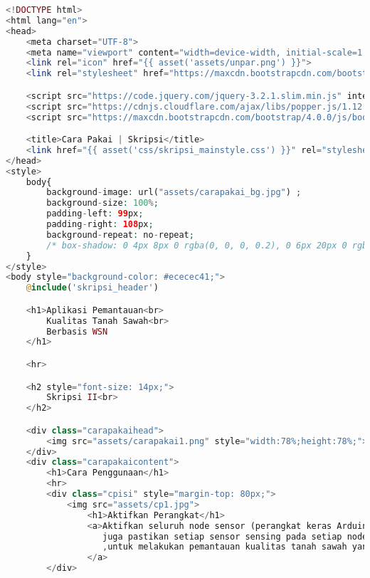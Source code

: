 \begin{lstlisting}[language=PHP, caption=skripsi\_carapakai.blade.php]
<!DOCTYPE html>
<html lang="en">
<head>
    <meta charset="UTF-8">
    <meta name="viewport" content="width=device-width, initial-scale=1.0, shrink-to-fit=no">
    <link rel="icon" href="{{ asset('assets/unpar.png') }}">
    <link rel="stylesheet" href="https://maxcdn.bootstrapcdn.com/bootstrap/4.0.0/css/bootstrap.min.css" integrity="sha384-Gn5384xqQ1aoWXA+058RXPxPg6fy4IWvTNh0E263XmFcJlSAwiGgFAW/dAiS6JXm" crossorigin="anonymous">

    <script src="https://code.jquery.com/jquery-3.2.1.slim.min.js" integrity="sha384-KJ3o2DKtIkvYIK3UENzmM7KCkRr/rE9/Qpg6aAZGJwFDMVNA/GpGFF93hXpG5KkN" crossorigin="anonymous"></script>
    <script src="https://cdnjs.cloudflare.com/ajax/libs/popper.js/1.12.9/umd/popper.min.js" integrity="sha384-ApNbgh9B+Y1QKtv3Rn7W3mgPxhU9K/ScQsAP7hUibX39j7fakFPskvXusvfa0b4Q" crossorigin="anonymous"></script>
    <script src="https://maxcdn.bootstrapcdn.com/bootstrap/4.0.0/js/bootstrap.min.js" integrity="sha384-JZR6Spejh4U02d8jOt6vLEHfe/JQGiRRSQQxSfFWpi1MquVdAyjUar5+76PVCmYl" crossorigin="anonymous"></script>

    <title>Cara Pakai | Skripsi</title>
    <link href="{{ asset('css/skripsi_mainstyle.css') }}" rel="stylesheet" type="text/css" >
</head>
<style>
    body{
        background-image: url("assets/carapakai_bg.jpg") ;
        background-size: 100%;
        padding-left: 99px;
        padding-right: 108px;
        background-repeat: no-repeat;
        /* box-shadow: 0 4px 8px 0 rgba(0, 0, 0, 0.2), 0 6px 20px 0 rgba(0, 0, 0, 0.19); */
    }
</style>
<body style="background-color: #ececec41;">
    @include('skripsi_header')

    <h1>Aplikasi Pemantauan<br> 
        Kualitas Tanah Sawah<br>
        Berbasis WSN
    </h1>

    <hr>

    <h2 style="font-size: 14px;">
        Skripsi II<br>
    </h2>

    <div class="carapakaihead">
        <img src="assets/carapakai1.png" style="width:78%;height:78%;">
    </div>
    <div class="carapakaicontent">
        <h1>Cara Penggunaan</h1>
        <hr>
        <div class="cpisi" style="margin-top: 80px;">
            <img src="assets/cp1.jpg">
                <h1>Aktifkan Perangkat</h1>
                <a>Aktifkan seluruh node sensor (perangkat keras Arduino dan Raspberry) 
                   juga pastikan setiap sensor sensing pada setiap node sensor aktif 
                   ,untuk melakukan pemantauan kualitas tanah sawah yang diuji.
                </a>
        </div>



\end{lstlisting}
